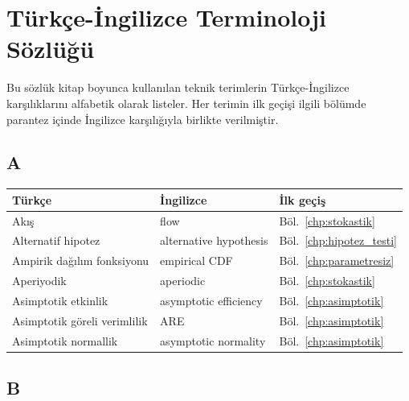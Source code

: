 \chapter{Türkçe-İngilizce Terminoloji Sözlüğü}
\label{app:terminoloji}

Bu sözlük kitap boyunca kullanılan teknik terimlerin Türkçe-İngilizce karşılıklarını alfabetik olarak listeler. Her terimin ilk geçişi ilgili bölümde parantez içinde İngilizce karşılığıyla birlikte verilmiştir.

\section{A}

\begin{tabular}{p{5cm}p{5cm}p{4cm}}
\hline
\textbf{Türkçe} & \textbf{İngilizce} & \textbf{İlk geçiş} \\
\hline
Akış & flow & Böl.~\ref{chp:stokastik} \\
Alternatif hipotez & alternative hypothesis & Böl.~\ref{chp:hipotez_testi} \\
Ampirik dağılım fonksiyonu & empirical CDF & Böl.~\ref{chp:parametresiz} \\
Aperiyodik & aperiodic & Böl.~\ref{chp:stokastik} \\
Asimptotik etkinlik & asymptotic efficiency & Böl.~\ref{chp:asimptotik} \\
Asimptotik göreli verimlilik & ARE & Böl.~\ref{chp:asimptotik} \\
Asimptotik normallik & asymptotic normality & Böl.~\ref{chp:asimptotik} \\
\hline
\end{tabular}

\section{B}

